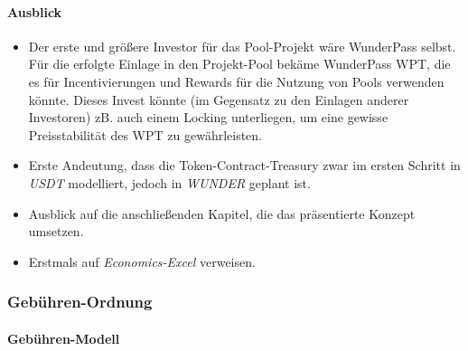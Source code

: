 \vspace{0.5cm}



\paragraph{Ausblick}
\textbf{ }
\vspace{0.3cm}


\begin{itemize}
	\item Der erste und größere Investor für das Pool-Projekt wäre WunderPass selbst. Für die erfolgte Einlage in den Projekt-Pool bekäme WunderPass WPT, die es für Incentivierungen und Rewards für die Nutzung von Pools verwenden könnte. Dieses Invest könnte (im Gegensatz zu den Einlagen anderer Investoren) zB. auch einem Locking unterliegen, um eine gewisse Preisstabilität des WPT zu gewährleisten.	
	\item Erste Andeutung, dass die Token-Contract-Treasury zwar im ersten Schritt in \textit{USDT} modelliert, jedoch in \textit{WUNDER} geplant ist.
	\item Ausblick auf die anschließenden Kapitel, die das präsentierte Konzept umsetzen.
	\item Erstmals auf \textit{Economics-Excel} verweisen.
\end{itemize}


\vspace{0.5cm}



\subsubsection{Gebühren-Ordnung}
\label{sec:fees}
\vspace{0.2cm}

\paragraph{Gebühren-Modell}
\textbf{ }
\vspace{0.2cm}

